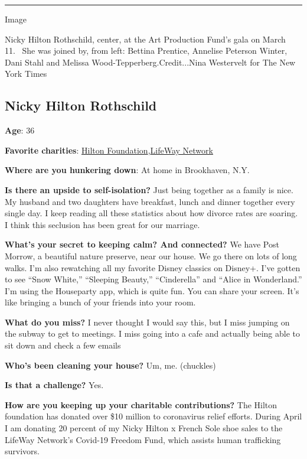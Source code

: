 \begin{center}\rule{0.5\linewidth}{\linethickness}\end{center}

Image

Nicky Hilton Rothschild, center, at the Art Production Fund's gala on
March 11.~ She was joined by, from left: Bettina Prentice, Annelise
Peterson Winter, Dani Stahl and Melissa Wood-Tepperberg.Credit...Nina
Westervelt for The New York Times

\hypertarget{nicky-hilton-rothschild}{%
\subsection{Nicky Hilton Rothschild}\label{nicky-hilton-rothschild}}

\textbf{Age}: 36

\textbf{Favorite charities}: \href{https://hiltonfoundation.org/}{Hilton
Foundation},\href{https://lifewaynetwork.org/}{LifeWay Network}

\textbf{Where are you hunkering down}: At home in Brookhaven, N.Y.

\textbf{Is there an upside to self-isolation?} Just being together as a
family is nice. My husband and two daughters have breakfast, lunch and
dinner together every single day. I keep reading all these statistics
about how divorce rates are soaring. I think this seclusion has been
great for our marriage.

\textbf{What's your secret to keeping calm? And connected?} We have Post
Morrow, a beautiful nature preserve, near our house. We go there on lots
of long walks. I'm also rewatching all my favorite Disney classics on
Disney+. I've gotten to see ``Snow White,'' ``Sleeping Beauty,''
``Cinderella'' and ``Alice in Wonderland.'' I'm using the Houseparty
app, which is quite fun. You can share your screen. It's like bringing a
bunch of your friends into your room.

\textbf{What do you miss?} I never thought I would say this, but I miss
jumping on the subway to get to meetings. I miss going into a cafe and
actually being able to sit down and check a few emails

\textbf{Who's been cleaning your house?} Um, me. (chuckles)

\textbf{Is that a challenge?} Yes.

\textbf{How are you keeping up your charitable contributions?} The
Hilton foundation has donated over \$10 million to coronavirus relief
efforts. During April I am donating 20 percent of my Nicky Hilton x
French Sole shoe sales to the LifeWay Network's Covid-19 Freedom Fund,
which assists human trafficking survivors.

